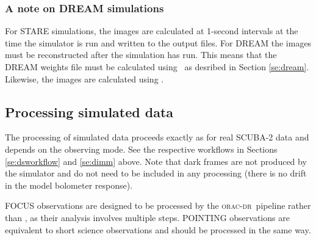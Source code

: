 \documentclass[oneside,11pt]{starlink}
\providecommand{\ORACDR}{\textsc{orac-dr}}
\begin{document}
\subsubsection{A note on DREAM simulations\label{se:dreamsim}}

For STARE simulations, the images are calculated at 1-second intervals
at the time the simulator is run and written to the output files. For
DREAM the images must be reconstructed after the simulation has
run. This means that the DREAM weights file must be calculated using
\dreamweights\ as desribed in Section \ref{se:dream}. Likewise, the
images are calculated using \dreamsolve.

\subsection{Processing simulated data\label{se:simdr}}

The processing of simulated data proceeds exactly as for real SCUBA-2
data and depends on the observing mode. See the respective workflows
in Sections \ref{se:dsworkflow} and \ref{se:dimm} above. Note
that dark frames are not produced by the simulator and do not need to
be included in any processing (there is no drift in the model
bolometer response).

FOCUS observations are designed to be processed by the \ORACDR\
pipeline rather than \SMURF, as their analysis involves multiple
steps. POINTING observations are equivalent to short science
observations and should be processed in the same way.
\end{document}
